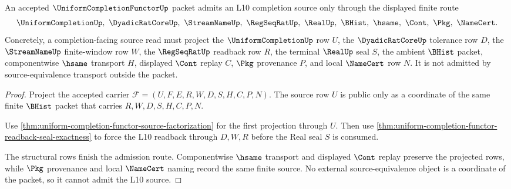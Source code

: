 \begin{theorem}
\label{thm:uniform-completion-functor-l10-source-admission}
An accepted $\UniformCompletionFunctorUp$ packet admits an L10 completion source only through the displayed finite route
$$
\UniformCompletionUp,\ \DyadicRatCoreUp,\ \StreamNameUp,\ \RegSeqRatUp,\ \RealUp,\ \BHist,\ \hsame,\ \Cont,\ \Pkg,\ \NameCert .
$$
Concretely, a completion-facing source read must project the $\UniformCompletionUp$ row $U$, the $\DyadicRatCoreUp$ tolerance row $D$, the $\StreamNameUp$ finite-window row $W$, the $\RegSeqRatUp$ readback row $R$, the terminal $\RealUp$ seal $S$, the ambient $\BHist$ packet, componentwise $\hsame$ transport $H$, displayed $\Cont$ replay $C$, $\Pkg$ provenance $P$, and local $\NameCert$ row $N$. It is not admitted by source-equivalence transport outside the packet.
\end{theorem}
\begin{proof}
Project the accepted carrier $\mathcal{F}=(U,F,E,R,W,D,S,H,C,P,N)$. The source row $U$ is public only as a coordinate of the same finite $\BHist$ packet that carries $R,W,D,S,H,C,P,N$.

Use \autoref{thm:uniform-completion-functor-source-factorization} for the first projection through $U$. Then use \autoref{thm:uniform-completion-functor-readback-seal-exactness} to force the L10 readback through $D,W,R$ before the Real seal $S$ is consumed.

The structural rows finish the admission route. Componentwise $\hsame$ transport and displayed $\Cont$ replay preserve the projected rows, while $\Pkg$ provenance and local $\NameCert$ naming record the same finite source. No external source-equivalence object is a coordinate of the packet, so it cannot admit the L10 source.
\end{proof}

